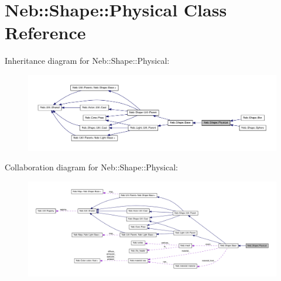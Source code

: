 \hypertarget{classNeb_1_1Shape_1_1Physical}{\section{\-Neb\-:\-:\-Shape\-:\-:\-Physical \-Class \-Reference}
\label{classNeb_1_1Shape_1_1Physical}
}


\-Inheritance diagram for \-Neb\-:\-:\-Shape\-:\-:\-Physical\-:\nopagebreak
\begin{figure}[H]
\begin{center}
\leavevmode
\includegraphics[width=350pt]{classNeb_1_1Shape_1_1Physical__inherit__graph}
\end{center}
\end{figure}


\-Collaboration diagram for \-Neb\-:\-:\-Shape\-:\-:\-Physical\-:\nopagebreak
\begin{figure}[H]
\begin{center}
\leavevmode
\includegraphics[width=350pt]{classNeb_1_1Shape_1_1Physical__coll__graph}
\end{center}
\end{figure}
